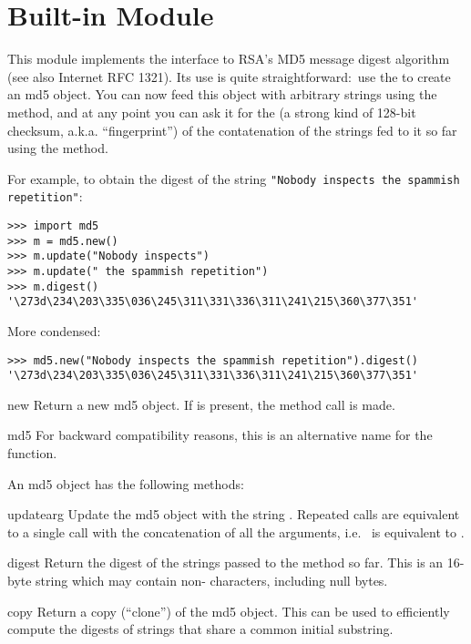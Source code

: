 \section{Built-in Module }
\label{module-md5}

This module implements the interface to RSA's MD5 message digest
algorithm (see also Internet RFC 1321).  Its use is quite
straightforward:\ use the  to create an md5 object.
You can now feed this object with arbitrary strings using the
 method, and at any point you can ask it for the
 (a strong kind of 128-bit checksum,
a.k.a. ``fingerprint'') of the contatenation of the strings fed to it
so far using the  method.

For example, to obtain the digest of the string {\tt"Nobody inspects
the spammish repetition"}:

\bcode\begin{verbatim}
>>> import md5
>>> m = md5.new()
>>> m.update("Nobody inspects")
>>> m.update(" the spammish repetition")
>>> m.digest()
'\273d\234\203\335\036\245\311\331\336\311\241\215\360\377\351'
\end{verbatim}\ecode
%
More condensed:

\bcode\begin{verbatim}
>>> md5.new("Nobody inspects the spammish repetition").digest()
'\273d\234\203\335\036\245\311\331\336\311\241\215\360\377\351'
\end{verbatim}\ecode
%
\renewcommand{\indexsubitem}{(in module md5)}

\begin{funcdesc}{new}{}
Return a new md5 object.  If  is present, the method call
 is made.
\end{funcdesc}

\begin{funcdesc}{md5}{}
For backward compatibility reasons, this is an alternative name for the
 function.
\end{funcdesc}

An md5 object has the following methods:

\renewcommand{\indexsubitem}{(md5 method)}
\begin{funcdesc}{update}{arg}
Update the md5 object with the string .  Repeated calls are
equivalent to a single call with the concatenation of all the
arguments, i.e.\  is equivalent to
.
\end{funcdesc}

\begin{funcdesc}{digest}{}
Return the digest of the strings passed to the 
method so far.  This is an 16-byte string which may contain
non-\ASCII{} characters, including null bytes.
\end{funcdesc}

\begin{funcdesc}{copy}{}
Return a copy (``clone'') of the md5 object.  This can be used to
efficiently compute the digests of strings that share a common initial
substring.
\end{funcdesc}
